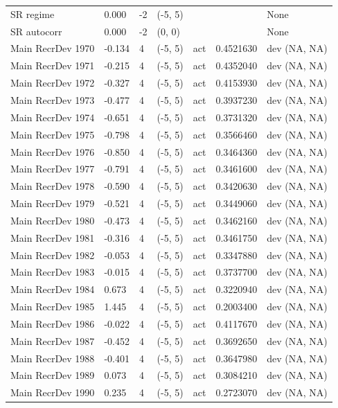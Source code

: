 \documentclass[
  english,
  a4paper,
]{article}
\begin{document}
\begin{landscape}
\begin{longtable}[t]{>{\raggedright\arraybackslash}p{8.5cm}lllll>{\raggedright\arraybackslash}p{4cm}}
SR regime & 0.000 & -2 & (-5, 5) &  &  & None\\
SR autocorr & 0.000 & -2 & (0, 0) &  &  & None\\
Main RecrDev 1970 & -0.134 & 4 & (-5, 5) & act & 0.4521630 & dev (NA, NA)\\
Main RecrDev 1971 & -0.215 & 4 & (-5, 5) & act & 0.4352040 & dev (NA, NA)\\
Main RecrDev 1972 & -0.327 & 4 & (-5, 5) & act & 0.4153930 & dev (NA, NA)\\
Main RecrDev 1973 & -0.477 & 4 & (-5, 5) & act & 0.3937230 & dev (NA, NA)\\
Main RecrDev 1974 & -0.651 & 4 & (-5, 5) & act & 0.3731320 & dev (NA, NA)\\
Main RecrDev 1975 & -0.798 & 4 & (-5, 5) & act & 0.3566460 & dev (NA, NA)\\
Main RecrDev 1976 & -0.850 & 4 & (-5, 5) & act & 0.3464360 & dev (NA, NA)\\
Main RecrDev 1977 & -0.791 & 4 & (-5, 5) & act & 0.3461600 & dev (NA, NA)\\
Main RecrDev 1978 & -0.590 & 4 & (-5, 5) & act & 0.3420630 & dev (NA, NA)\\
Main RecrDev 1979 & -0.521 & 4 & (-5, 5) & act & 0.3449060 & dev (NA, NA)\\
Main RecrDev 1980 & -0.473 & 4 & (-5, 5) & act & 0.3462160 & dev (NA, NA)\\
Main RecrDev 1981 & -0.316 & 4 & (-5, 5) & act & 0.3461750 & dev (NA, NA)\\
Main RecrDev 1982 & -0.053 & 4 & (-5, 5) & act & 0.3347880 & dev (NA, NA)\\
Main RecrDev 1983 & -0.015 & 4 & (-5, 5) & act & 0.3737700 & dev (NA, NA)\\
Main RecrDev 1984 & 0.673 & 4 & (-5, 5) & act & 0.3220940 & dev (NA, NA)\\
Main RecrDev 1985 & 1.445 & 4 & (-5, 5) & act & 0.2003400 & dev (NA, NA)\\
Main RecrDev 1986 & -0.022 & 4 & (-5, 5) & act & 0.4117670 & dev (NA, NA)\\
Main RecrDev 1987 & -0.452 & 4 & (-5, 5) & act & 0.3692650 & dev (NA, NA)\\
Main RecrDev 1988 & -0.401 & 4 & (-5, 5) & act & 0.3647980 & dev (NA, NA)\\
Main RecrDev 1989 & 0.073 & 4 & (-5, 5) & act & 0.3084210 & dev (NA, NA)\\
Main RecrDev 1990 & 0.235 & 4 & (-5, 5) & act & 0.2723070 & dev (NA, NA)\\

\end{longtable}
\end{landscape}
\end{document}
